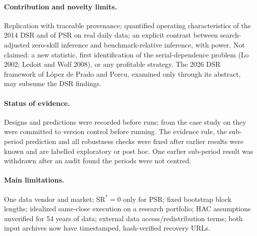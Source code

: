 \documentclass[10pt,a4paper]{article}
\begin{document}
\paragraph{Contribution and novelty limits.} Replication with traceable provenance; quantified operating characteristics of the 2014 DSR and of PSR on real daily data; an explicit contrast between search-adjusted zero-skill inference and benchmark-relative inference, with power. Not claimed: a new statistic, first identification of the serial-dependence problem (Lo 2002; Ledoit and Wolf 2008), or any profitable strategy. The 2026 DSR framework of L\'opez de Prado and Porcu, examined only through its abstract, may subsume the DSR findings.

\paragraph{Status of evidence.} Designs and predictions were recorded before runs; from the case study on they were committed to version control before running. The evidence rule, the sub-period prediction and all robustness checks were fixed after earlier results were known and are labelled exploratory or post hoc. One earlier sub-period result was withdrawn after an audit found the periods were not centred.

\paragraph{Main limitations.} One data vendor and market; $\mathrm{SR}^\ast=0$ only for PSR; fixed bootstrap block lengths; idealized same-close execution on a research portfolio; HAC assumptions unverified for 54 years of data; external data access/redistribution terms; both input archives now have timestamped, hash-verified recovery URLs.
\end{document}
